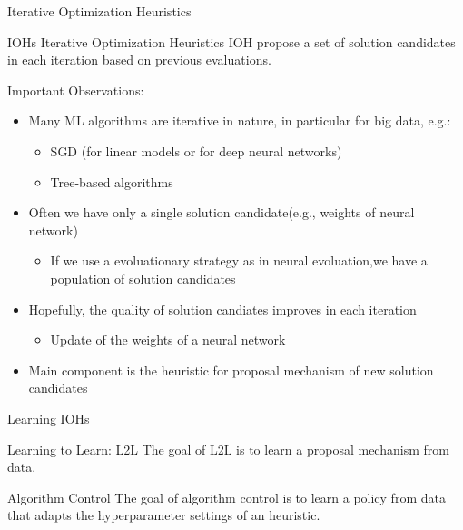 \begin{frame}[c]{Iterative Optimization Heuristics}

\begin{block}{IOHs}
	Iterative Optimization Heuristics {IOH} propose a set of solution candidates in each iteration
	based on previous evaluations.
\end{block}

\pause
\smallskip
Important Observations:
\begin{itemize}
	\item Many ML algorithms are  \alert{iterative} in nature, in particular for big data, e.g.:
	\begin{itemize}
		\item SGD (for linear models or for deep neural networks)
		\item Tree-based algorithms
	\end{itemize}
	\pause
	\smallskip
	\item Often we have only a \alert{single solution candidate}\newline (e.g., weights of neural network)
	\begin{itemize}
		\item If we use a evoluationary strategy as in neural evoluation,\newline we have a population of solution candidates
	\end{itemize}
	\pause
	\smallskip
	\item Hopefully, the \alert{quality} of solution candiates \alert{improves} in each iteration
	\begin{itemize}
		\item Update of the weights of a neural network
	\end{itemize}
	\pause
	\smallskip
	\item Main component is the \alert{heuristic for proposal mechanism} of new solution candidates
\end{itemize}

\end{frame}
\begin{frame}[c]{Learning IOHs}
	
\begin{block}{Learning to Learn: L2L}
	The goal of L2L is to learn a \alert{proposal mechanism} from data.
\end{block}


\bigskip
\pause

\begin{block}{Algorithm Control}
	The goal of algorithm control is to learn a policy from data that adapts the \alert{hyperparameter settings} of an heuristic.
\end{block}

	
\end{frame}
